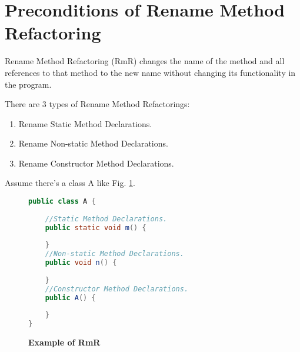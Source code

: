 \section{\textbf{Preconditions of Rename Method Refactoring}}

Rename Method Refactoring (RmR) changes the name of the method and all references to that method to the new name without changing its functionality in the program.

There are 3 types of Rename Method Refactorings:
\begin{enumerate}
\item Rename Static Method Declarations.
\item Rename Non-static Method Declarations.
\item Rename Constructor Method Declarations.
\end{enumerate}

Assume there's a class A like Fig. \ref{fig:RmR}.

\begin{figure}[th]
\centering
\begin{minipage}[t]{0.8\linewidth}
\begin{lstlisting}[language=java, basicstyle=\scriptsize\ttfamily,frame=single]
public class A {
    
	//Static Method Declarations.
	public static void m() {
		
	}
	//Non-static Method Declarations.
	public void n() {
		
	}
	//Constructor Method Declarations.
	public A() {
		
	}
}
\end{lstlisting}
\end{minipage}
\hfill

\caption{\textbf{Example of RmR}}
\label{fig:RmR}
\end{figure}